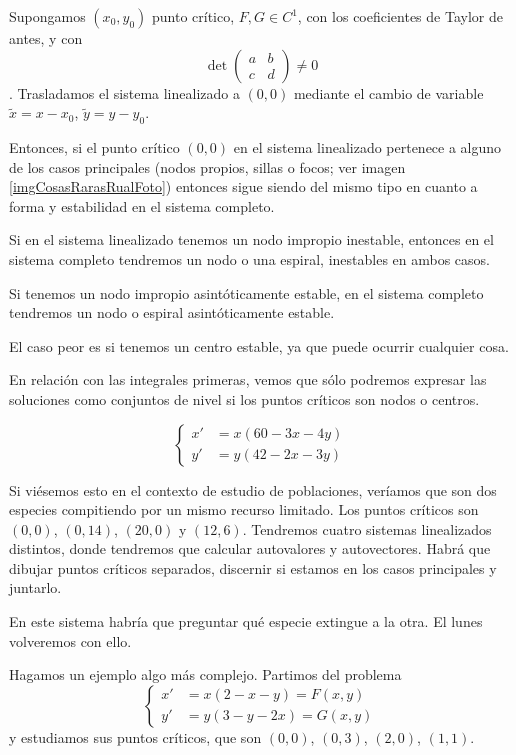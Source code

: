\begin{theorem} Supongamos $(x_0, y_0)$ punto crítico, $F, G∈C^1$, con los coeficientes de Taylor de antes, y con \[ \det \begin{pmatrix}
a & b \\ c & d
\end{pmatrix} ≠ 0 \]. Trasladamos el sistema linealizado a $(0,0)$ mediante el cambio de variable $\tilde{x} = x - x_0$, $\tilde{y}= y-y_0$. 

Entonces, si el punto crítico $(0,0)$ en el sistema linealizado pertenece a alguno de los casos principales (nodos propios, sillas o focos; ver imagen \ref{imgCosasRarasRualFoto}) entonces sigue siendo del mismo tipo en cuanto a forma y estabilidad en el sistema completo.

Si en el sistema linealizado tenemos un nodo impropio inestable, entonces en el sistema completo tendremos un nodo o una espiral, inestables en ambos casos.

Si tenemos un nodo impropio asintóticamente estable, en el sistema completo tendremos un nodo o espiral asintóticamente estable.

El caso peor es  si tenemos un centro estable, ya que puede ocurrir cualquier cosa.
\end{theorem}

En relación con las integrales primeras, vemos que sólo podremos expresar las soluciones como conjuntos de nivel si los puntos críticos son nodos o centros.

\begin{example}
\[\begin{cases}
x' &= x(60-3x-4y) \\
y' &= y(42-2x-3y)
\end{cases} \]

Si viésemos esto en el contexto de estudio de poblaciones, veríamos que son dos especies compitiendo por un mismo recurso limitado. Los puntos críticos son $(0,0)$, $\left(0, 14\right)$, $(20, 0)$ y $(12, 6)$. Tendremos cuatro sistemas linealizados distintos, donde tendremos que calcular autovalores y autovectores. Habrá que dibujar puntos críticos separados, discernir si estamos en los casos principales y juntarlo.

En este sistema habría que preguntar qué especie extingue a la otra. El lunes volveremos con ello.
\end{example}


Hagamos un ejemplo algo más complejo. Partimos del problema \[ \begin{cases} x' &= x(2-x-y) = F(x,y) \\ y' &= y(3-y-2x) = G(x,y) \end{cases} \] y estudiamos sus puntos críticos, que son $(0,0)$, $(0,3)$, $(2,0)$, $(1,1)$. 

